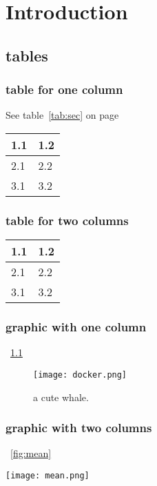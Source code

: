 \chapter{Introduction}

\section{tables}

\subsection{table for one column}
\blindtext[3] See table~\ref{tab:sec} on page~\pageref{tab:sec}
\begin{Table}
  \begin{tabularx}{\textwidth}[htb]{X X}
    \toprule
    1.1 & 1.2 \\
    \midrule
    2.1 & 2.2 \\
    3.1 & 3.2 \\
    \bottomrule
  \end{tabularx}
  \captionsetup{type=table}
  \caption{My first table.}\label{tab:first}
\end{Table}

\subsection{table for two columns}
\blindtext{}
\begin{table*}
  \caption{My second table.}\label{tab:sec}
  \begin{tabularx}{\textwidth}{X X}
    \toprule
    1.1 & 1.2 \\
    \midrule
    2.1 & 2.2 \\
    3.1 & 3.2 \\
    \bottomrule
  \end{tabularx}
\end{table*}
\blindtext{}\cite{DUMMY:1}

\subsection{graphic with one column}
\blindtext[3]~\ref{fig:docker}
\begin{figure}[ht]
  \centering
  \texttt{[image: docker.png]}
  \caption{a cute whale.}\label{fig:docker}
\end{figure}
\subsection{graphic with two columns}
\blindtext[1]~\ref{fig:mean}
\begin{figure*}
  \texttt{[image: mean.png]}
  \caption{a mean stack.}\label{fig:mean}
\end{figure*}
\blindtext[3]
